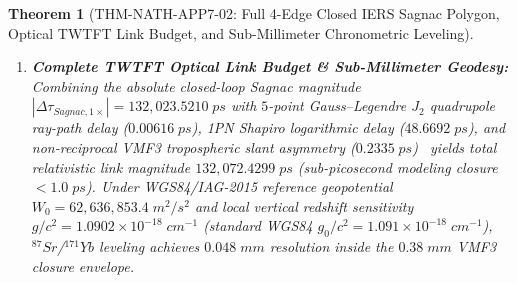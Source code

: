 \documentclass[11pt,a4paper,reqno]{article}
\def\texttt#1{#1}%
\def\mathrm#1{#1}%
\theoremstyle{plain}
\newtheorem{theorem}{Theorem}[section]
\theoremstyle{definition}
\theoremstyle{remark}
\numberwithin{equation}{section}
\numberwithin{table}{section}
\begin{document}
\begin{theorem}[{\texttt{THM-NATH-APP7-02}: Full 4-Edge Closed IERS Sagnac Polygon, Optical TWTFT Link Budget, and Sub-Millimeter Chronometric Leveling}]
\begin{enumerate}[label=(\roman*)]
\begin{equation}
    \label{eq:sagnac_1x}
  \end{equation}
  Here, whereas standard IERS Conventions (2010) Eq.~(5.1) express the full J2000.0 terrestrial-to-celestial transformation as $Q_{\mathrm{full}}(t)\, R_3(-\mathrm{ERA}(t))\, W(t)$, Eq.~\eqref{eq:iers_spin_vec} operates in the calibrated date/EOP convention where $Q(t)$ captures the incremental IERS celestial-pole offset $(\delta X, \delta Y)$ relative to the mean equator of date and $W(t)$ applies $(x_p, y_p)$ polar motion, producing a net transverse spin tilt $|\boldsymbol{\omega}_\perp| = 4.127389\times 10^{-11}\;\mathrm{rad/s}$ ($|\boldsymbol{\omega}_\perp|/\omega_0 = 5.660\times 10^{-7}\;\mathrm{rad} \approx 0.117''$). Across the benchmark MEO optical link at $\mathrm{MJD}~61000.25$ (Table~\ref{tab:twtft_budget}), eqs.~\eqref{eq:sagnac_4edge}--\eqref{eq:sagnac_1x} evaluate to $\mathbf{-132{,}023.5210\;\mathrm{ps}}$ ($2\times$ round-trip: $-264{,}047.0421\;\mathrm{ps}$), directly correcting the $-5{,}436.9481\;\mathrm{ps}$ missing-area bias of legacy $2$-edge approximations ($\|\Delta\mathbf{A}\| = 2.241561\times 10^{13}\;\mathrm{m}^2$, $\Delta A_\parallel = -3.350527\times 10^{12}\;\mathrm{m}^2$) and recovering the $+0.037374\;\mathrm{ps}$ ($37.374\;\mathrm{fs}$) IERS EOP transverse shift.
  \item \textbf{Complete TWTFT Optical Link Budget \& Sub-Millimeter Geodesy:} Combining the absolute closed-loop Sagnac magnitude $|\Delta\tau_{\mathrm{Sagnac},1\times}| = 132{,}023.5210\;\mathrm{ps}$ with $5$-point Gauss--Legendre $J_2$ quadrupole ray-path delay ($0.00616\;\mathrm{ps}$), 1PN Shapiro logarithmic delay ($48.6692\;\mathrm{ps}$), and non-reciprocal VMF3 tropospheric slant asymmetry ($0.2335\;\mathrm{ps}$)~\cite{LandskronBohm2018VMF3} yields total relativistic link magnitude $132{,}072.4299\;\mathrm{ps}$ (sub-picosecond modeling closure $< 1.0\;\mathrm{ps}$). Under WGS84/IAG-2015 reference geopotential $W_0 = 62{,}636{,}853.4\;\mathrm{m}^2/\mathrm{s}^2$ and local vertical redshift sensitivity $g/c^2 = 1.0902 \times 10^{-18}\;\mathrm{cm}^{-1}$ (standard WGS84 $g_0/c^2 = 1.091 \times 10^{-18}\;\mathrm{cm}^{-1}$), $^{87}\mathrm{Sr}$/$^{171}\mathrm{Yb}$ leveling achieves $0.048\;\mathrm{mm}$ resolution inside the $0.38\;\mathrm{mm}$ VMF3 closure envelope.
\end{enumerate}
\end{theorem}
\end{document}
